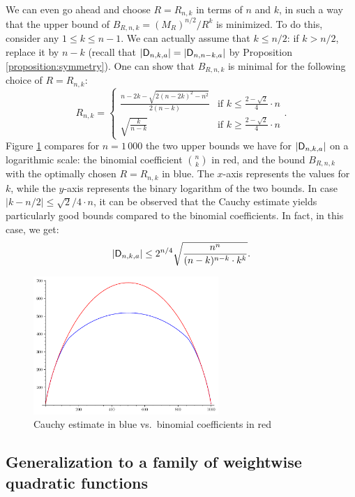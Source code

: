 \documentclass[11pt]{llncs}
\begin{document}
{\begin{remark}
    We can even go ahead and choose $R=R_{n,k}$ in terms of $n$ and $k$, in such a way that the upper bound of $B_{R,n,k}=(M_R)^{n/2}/R^k$ is minimized. To do this, consider any $1\leq k\leq n-1$. We can actually assume that $k\leq n/2$: if $k>n/2$, replace it by $n-k$ (recall that $|\mathsf{D}_{n,k,a}|=|\mathsf{D}_{n,n-k,a}|$ by Proposition \ref{proposition:symmetry}). One can show that $B_{R,n,k}$ is minimal for the following choice of $R=R_{n,k}$:
    \[
        R_{n,k}=\begin{cases}
            \frac{n-2k-\sqrt{2(n-2k)^2-n^2}}{2(n-k)}&\text{if $k\leq\frac{2-\sqrt 2}{4}\cdot n$}\\
            \sqrt{\frac{k}{n-k}}&\text{if $k\geq\frac{2-\sqrt 2}{4}\cdot n$}
        \end{cases}.
    \]
    Figure \ref{fig:cauchy_estimate} compares for $n=1\,000$ the two upper bounds we have for $|\mathsf{D}_{n,k,a}|$ on a logarithmic scale: the binomial coefficient $\binom nk$ in red, and the bound $B_{R,n,k}$ with the optimally chosen $R=R_{n,k}$ in blue. The $x$-axis represents the values for $k$, while the $y$-axis represents the binary logarithm of the two bounds. In case $|k-n/2|\leq\sqrt{2}/4\cdot n$, it can be observed that the Cauchy estimate yields particularly good bounds compared to the binomial coefficients. In fact, in this case, we get:
    \[
        |\mathsf{D}_{n,k,a}|\leq 2^{n/4}\sqrt{\frac{n^n}{(n-k)^{n-k}\cdot k^k}}.
    \]
    \begin{figure}
        \centering
        \includegraphics[width=7cm]{cauchy_estimate.pdf}
        \caption{Cauchy estimate in blue vs.\ binomial coefficients in red}
        \label{fig:cauchy_estimate}
    \end{figure}
\end{remark}}




\subsection{Generalization to a family of weightwise quadratic functions}\label{sec:general}
\end{document}
